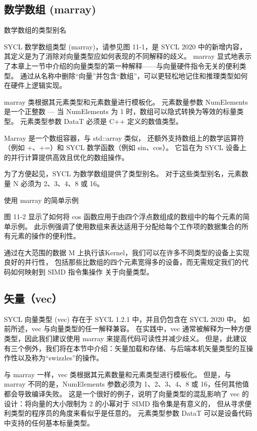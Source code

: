 \subsection{数学数组 (marray)}
{\color{red} 数学数组的类型别名}

SYCL 数学数组类型 (marray)，请参见图 11-1，是 SYCL 2020 中的新增内容，
其定义是为了消除对向量类型应如何表现的不同解释的歧义。 
marray 显式地表示了本章上一节中介绍的向量类型的第一种解释——与向量硬件指令无关的便利类型。 
通过从名称中删除“向量”并包含“数组”，可以更轻松地记住和推理类型如何在硬件上逻辑实现。

marray 类根据其元素类型和元素数量进行模板化。 
元素数量参数 NumElements 是一个正整数 — 当 NumElements 为 1 时，数组可以隐式转换为等效的标量类型。 
元素类型参数 DataT 必须是 C++ 定义的数值类型。

Marray 是一个数组容器，与 std::array 类似，
还额外支持数组上的数学运算符（例如 +、+=）和 SYCL 数学函数（例如 sin、cos）。 
它旨在为 SYCL 设备上的并行计算提供高效且优化的数组操作。

为了方便起见，SYCL 为数学数组提供了类型别名。 
对于这些类型别名，元素数量 N 必须为 2、3、4、8 或 16。

{\color{red} 使用 marray 的简单示例}

图 11-2 显示了如何将 cos 函数应用于由四个浮点数组成的数组中的每个元素的简单示例。 
此示例强调了使用数组来表达适用于分配给每个工作项的数据集合的所有元素的操作的便利性。

通过在大范围的数据 M 上执行该Kernel，我们可以在许多不同类型的设备上实现良好的并行性，
包括那些比数组的四个元素宽得多的设备，而无需规定我们的代码如何映射到 SIMD 指令集操作 关于向量类型。

\subsection{矢量（vec）}
SYCL 向量类型 (vec) 存在于 SYCL 1.2.1 中，并且仍包含在 SYCL 2020 中。
如前所述，vec 与向量类型的任一解释兼容。 
在实践中，vec 通常被解释为一种方便类型，因此我们建议使用 marray 来提高代码可读性并减少歧义。 
但是，此建议有三个例外，我们将在本节中介绍：矢量加载和存储、与后端本机矢量类型的互操作性以及称为“swizzles”的操作。

与 marray 一样，vec 类根据其元素数量和元素类型进行模板化。 
但是，与 marray 不同的是，NumElements 参数必须为 1、2、3、4、8 或 16，任何其他值都会导致编译失败。 
这是一个很好的例子，说明了向量类型的混乱影响了 vec 的设计：将向量的大小限制为 2 的小幂对于 SIMD 指令集是有意义的，
但从寻求便利类型的程序员的角度来看似乎是任意的。 元素类型参数 DataT 可以是设备代码中支持的任何基本标量类型。

